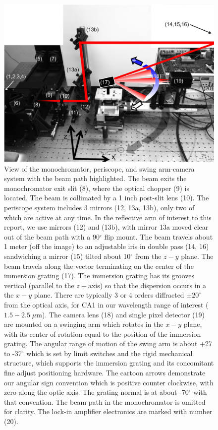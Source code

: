 \begin{figure}
\begin{center}
    \includegraphics[width=1.0\textwidth]{chSPIE_2012_CA1/figs/GTA_cam_model_ref_tilt.jpg}
  \end{center}
  \caption[View of the monochromator, periscope, and swing arm-camera system with the beam path highlighted]{\label{fig:GTAview} View of the monochromator, periscope, and swing arm-camera system with the beam path highlighted.  The beam exits the monochromator exit slit (8), where the optical chopper (9) is located.  The beam is collimated by a 1 inch post-slit lens (10).  The periscope system includes 3 mirrors (12, 13a, 13b), only two of which are active at any time.  In the reflective arm of interest to this report, we use mirrors (12) and (13b), with mirror 13a moved clear out of the beam path with a 90$^\circ$ flip mount.  The beam travels about 1 meter (off the image) to an adjustable iris in double pass (14, 16) sandwiching a mirror (15) tilted about 10$^\circ$ from the $z-y$ plane.  The beam travels along the vector terminating on the center of the immersion grating (17).  The immersion grating has its grooves vertical (parallel to the $z-$axis) so that the dispersion occurs in a the $x-y$ plane.  There are typically 3 or 4 orders diffracted $\pm20^\circ$ from the optical axis, for CA1 in our wavelength range of interest ($1.5-2.5 \; \mu$m).  The camera lens (18) and single pixel detector (19) are mounted on a swinging arm which rotates in the $x-y$ plane, with its center of rotation equal to the position of the immersion grating.  The angular range of motion of the swing arm is about +27 to -37$^\circ$ which is set by limit switches and the rigid mechanical structure, which supports the immersion grating and its concomitant fine adjust positioning hardware.  The cartoon arrows demonstrate our angular sign convention which is positive counter clockwise, with zero along the optic axis.  The grating normal is at about -70$^\circ$ with that convention.  The beam path in the monochromator is omitted for clarity.  The lock-in amplifier electronics are marked with number (20).}
\end{figure}

